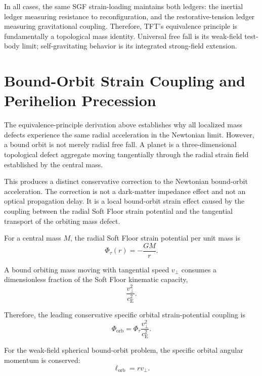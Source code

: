 In all cases, the same SGF strain-loading maintains both ledgers: the inertial ledger measuring resistance to reconfiguration, and the restorative-tension ledger measuring gravitational coupling. Therefore, TFT's equivalence principle is fundamentally a topological mass identity. Universal free fall is its weak-field test-body limit; self-gravitating behavior is its integrated strong-field extension.

\section{Bound-Orbit Strain Coupling and Perihelion Precession}
\label{sec:perihelion_strain_coupling}

The equivalence-principle derivation above establishes why all localized mass defects experience the same radial acceleration in the Newtonian limit. However, a bound orbit is not merely radial free fall. A planet is a three-dimensional topological defect aggregate moving tangentially through the radial strain field established by the central mass.

This produces a distinct conservative correction to the Newtonian bound-orbit acceleration. The correction is not a dark-matter impedance effect and not an optical propagation delay. It is a local bound-orbit strain effect caused by the coupling between the radial Soft Floor strain potential and the tangential transport of the orbiting mass defect.

For a central mass $M$, the radial Soft Floor strain potential per unit mass is
\begin{equation}
    \Phi_\tau(r) = - \frac{GM}{r}.
\end{equation}

A bound orbiting mass moving with tangential speed $v_\perp$ consumes a dimensionless fraction of the Soft Floor kinematic capacity,
\begin{equation}
    \frac{v_\perp^2}{c_{\mathrm{E}}^2}.
\end{equation}

Therefore, the leading conservative specific orbital strain-potential coupling is
\begin{equation}
    \Phi_{\mathrm{orb}} = \Phi_\tau \frac{v_\perp^2}{c_{\mathrm{E}}^2}.
\end{equation}

For the weak-field spherical bound-orbit problem, the specific orbital angular momentum is conserved:
\begin{equation}
    \ell_{\mathrm{orb}} = rv_\perp.
\end{equation}

